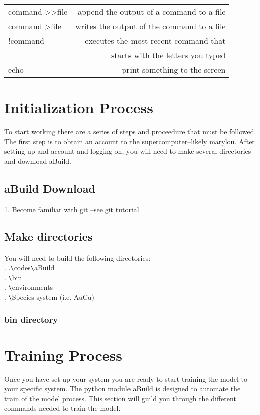 \documentclass{article}
\begin{document}
\begin{table}
\begin{center}
\begin{tabular}{l|r}
                        command \textgreater \textgreater file & append the output of a
                        command to a file \\
                        command \textgreater file & writes the output of the
                        command to a file \\
                        !command & executes the most recent command
                        that \\
                         & starts with the letters you typed \\
                        echo & print something to the screen \\
                 \end{tabular}
        \end{center}
\end{table}
                        
\section{Initialization Process}
To start working there are a series of steps and proceedure that must
be followed. The first step is to obtain an account to the supercomputer--likely
marylou. After setting up and account and logging on, you will need to
make several directories and download aBuild.  
\subsection{aBuild Download}
1. Become familiar with git --see git tutorial
\subsection{Make directories}
You will need to build the following directories:\\
. .\verb|\|codes\verb|\|aBuild\\
. \verb|\|bin\\
. \verb|\|environments\\
. \verb|\|Species-system (i.e. AuCu)

\subsubsection{bin directory}
\section{Training Process}                      
Once you have set up your system you are ready to start training the
model to your specific system. The python module aBuild is designed to
automate the train of the model process. This section will guild you
through the different commands needed to train the model.\\
\end{document}
